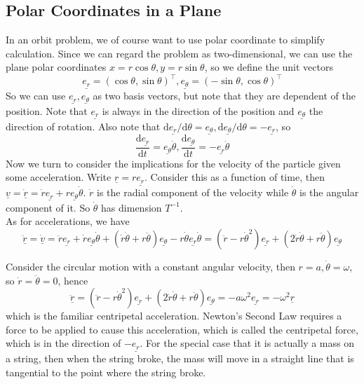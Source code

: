 \subsection{Polar Coordinates in a Plane}
In an orbit problem, we of course want to use polar coordinate to simplify calculation.
Since we can regard the problem as two-dimensional, we can use the plane polar coordinates $x=r\cos\theta,y=r\sin\theta$, so we define the unit vectors
$$\underline{e_r}=(\cos\theta,\sin\theta)^\top,\underline{e_\theta}=(-\sin\theta,\cos\theta)^\top$$
So we can use $\underline{e_r},\underline{e_\theta}$ as two basis vectors, but note that they are dependent of the position.
Note that $\underline{e_r}$ is always in the direction of the position and $\underline{e_\theta}$ the direction of rotation.
Also note that $\mathrm d\underline{e_r}/\mathrm d\theta=\underline{e_\theta},\mathrm d\underline{e_\theta}/\mathrm d\theta=-\underline{e_r}$, so
$$\frac{\mathrm d\underline{e_r}}{\mathrm dt}=\underline{e_\theta}\dot{\theta},\frac{\mathrm d\underline{e_\theta}}{\mathrm dt}=-\underline{e_r}\dot{\theta}$$
Now we turn to consider the implications for the velocity of the particle given some acceleration.
Write $\underline{r}=r\underline{e_r}$.
Consider this as a function of time, then $\underline{v}=\underline{\dot{r}}=\dot{r}\underline{e_r}+r\underline{e_\theta}\dot{\theta}$.
$\dot{r}$ is the radial component of the velocity while $\dot{\theta}$ is the angular component of it.
So $\dot{\theta}$ has dimension $T^{-1}$.\\
As for accelerations, we have
$$\underline{\ddot{r}}=\underline{\dot{v}}=\ddot{r}\underline{e_r}+\dot{r}\underline{e_\theta}\dot{\theta}+(\dot{r}\dot{\theta}+r\ddot{\theta})\underline{e_\theta}-r\dot{\theta}\underline{e_r}\dot{\theta}=(\ddot{r}-r\dot{\theta}^2)\underline{e_r}+(2\dot{r}\dot{\theta}+r\ddot{\theta})\underline{e_\theta}$$
\begin{example}
    Consider the circular motion with a constant angular velocity, then $r=a,\dot{\theta}=\omega$, so $\dot{r}=\ddot{\theta}=0$, hence
    $$\underline{\ddot{r}}=(\ddot{r}-r\dot{\theta}^2)\underline{e_r}+(2\dot{r}\dot{\theta}+r\ddot{\theta})\underline{e_\theta}=-a\omega^2\underline{e_r}=-\omega^2\underline{r}$$
    which is the familiar centripetal acceleration.
    Newton's Second Law requires a force to be applied to cause this acceleration, which is called the centripetal force, which is in the direction of $-\underline{e_r}$.
    For the special case that it is actually a mass on a string, then when the string broke, the mass will move in a straight line that is tangential to the point where the string broke.
\end{example}
